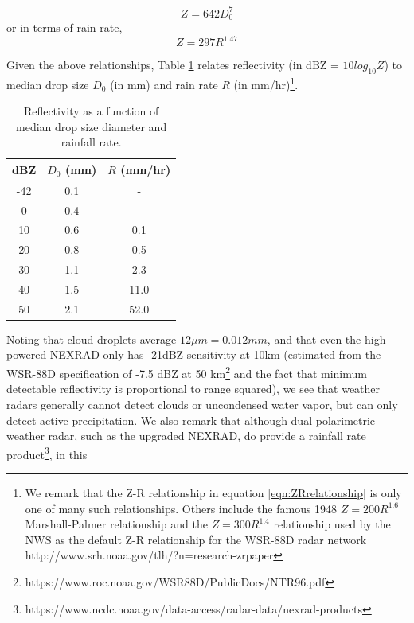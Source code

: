 \documentclass[proposal]{umassthesis}
\begin{document}
\begin{equation}
 Z = 642 D_{0}^7
\end{equation}
or in terms of rain rate,
\begin{equation}
 Z = 297 R^{1.47}
 \label{eqn:ZRrelationship}
\end{equation}

Given the above relationships, Table \ref{Radar_Table} relates reflectivity (in dBZ = $10 log_{10} Z$) to median drop size $D_{0}$ (in mm) and rain rate $R$ (in mm/hr)\footnote{We remark that the Z-R relationship in equation \ref{eqn:ZRrelationship} is only one of many such relationships. Others include the famous 1948 $Z = 200 R^{1.6}$ Marshall-Palmer relationship \cite{marshall1948distribution} and the $Z = 300 R^{1.4}$ relationship used by the NWS as the default Z-R relationship for the WSR-88D radar network http://www.srh.noaa.gov/tlh/?n=research-zrpaper}. 
\begin{table}[!h]
\begin{center}
\caption{Reflectivity as a function of median drop size diameter and rainfall rate.}
\label{Radar_Table}
\begin{tabular}{|ccc|}
\hline
dBZ &$D_{0}$ (mm) & $R$ (mm/hr) \\
\hline
-42  & 0.1 & - \\
0 & 0.4 &  - \\
10 & 0.6 & 0.1 \\
20 & 0.8 & 0.5 \\
30 & 1.1 & 2.3 \\
40 & 1.5 & 11.0 \\
50 & 2.1 & 52.0 \\
\hline
\end{tabular}
\end{center}
\end{table}
 Noting that cloud droplets average $12 \mu m = 0.012 mm$, and that even
 the high-powered NEXRAD only has -21dBZ sensitivity at 10km
 (estimated from the WSR-88D specification of -7.5 dBZ at 50 km\footnote{https://www.roc.noaa.gov/WSR88D/PublicDocs/NTR96.pdf}
 and the fact that minimum detectable reflectivity is proportional to
 range squared), we see that weather radars generally cannot detect
 clouds or uncondensed water vapor, but can only detect active
 precipitation.
 We also remark that although dual-polarimetric weather radar, such as
 the upgraded NEXRAD, do provide a rainfall rate product\footnote{https://www.ncdc.noaa.gov/data-access/radar-data/nexrad-products}, in this
\end{document}
